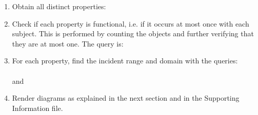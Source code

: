 \begin{enumerate}[leftmargin=0cm]
	\item Obtain all distinct properties:\\
	\item Check if each property is functional, i.e. if it
		occurs at most once with each subject.
		This is performed by counting the objects and further verifying
		that they are at most one. The query is:\\
	\item For each property, find the incident range and domain with the
		queries:\\
		 \\
		and \\
	\item Render diagrams as explained in the next section and in the Supporting Information file.
\end{enumerate}
